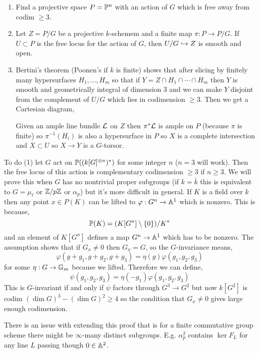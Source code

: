 \documentclass[12pt]{article}
\begin{document}
\begin{enumerate}
\item Find a projective space $P = \P^n$ with an action of $G$ which is free away from codim $\ge 3$. 

\item Let $Z = P / G$ be a projective $k$-schemem and a finite map $\pi : P \to P / G$. If $U \subset P$ is the free locus for the action of $G$, then $U / G \embed Z$ is smooth and open.

\item Bertini's theorem (Poonen's if $k$ is finite) shows that after slicing by finitely many hypersurfaces $H_1, \dots, H_m$ so that if $Y = Z \cap H_1 \cap \cdots \cap H_m$ then $Y$ is smooth and geometrically integral of dimension $3$ and we can make $Y$ disjoint from the complement of $U/G$ which lies in codimension $\ge 3$. Then we get a Cartesian diagram,
\begin{center}
\end{center}
Given an ample line bundle $\L$ on $Z$ then $\pi^* \L$ is ample on $P$ (because $\pi$ is finite) so $\pi^{-1}(H_i)$ is also a hypersurface in $P$ so $X$ is a complete intersection and $X \subset U$ so $X \to Y$ is a $G$-torsor. 
\end{enumerate}

To do (1) let $G$ act on $\P((k[G]^{\ot n})^*)$ for some integer $n$ ($n = 3$ will work). Then the free locus of this action is complementary codimension $\ge 3$ if $n \ge 3$. We will prove this when $G$ has no nontrivial proper subgroups (if $k = \bar{k}$ this is equivalent to $G = \mu_\ell$ or $\Z / p \Z$ or $\alpha_p$) but it's more difficult in general. If $K$ is a field over $k$ then any point $x \in P(K)$ can be lifted to $\varphi : G^n \to \A^1$ which is nonzero. This is because,
\[ \P(K) = (K[G^n] \setminus \{ 0 \}) / K^* \]
and an element of $K[G^n]$ defines a map $G^n \to \A^1$ which has to be nonzero. The assumption shows that if $G_x \neq 0$ then $G_x = G$, so the $G$-invariance means,
\[ \varphi(g + g_1, g + g_2, g + g_3) = \eta(g) \varphi(g_1, g_2, g_3) \]
for some $\eta : G \to \Gm$ because we lifted. Therefore we can define,
\[ \psi(g_1, g_2, g_3) = \eta(-g_1) \varphi(g_1, g_2, g_3) \]
This is $G$-invariant if and only if $\psi$ factors through $G^3 \to G^2$ but now $k[G^2]$ is codim $(\dim{G})^3 - (\dim{G})^2 \ge 4$ so the condition that $G_x \neq 0$ gives large enough codimension.

\begin{rmk}
There is an issue with extending this proof that is for a finite commutative group scheme there might be $\infty$-many distinct subgroups. E.g. $\alpha_p^2$ contains $\ker{F_L}$ for any line $L$ passing though $0 \in \A^2$.
\end{rmk}
\end{document}
